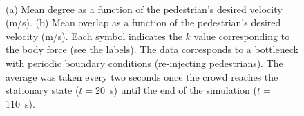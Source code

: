 \documentclass[preprint,12pt]{elsarticle}
\begin{document}
\begin{figure}[!htbp]
\centering
    \ 
    \\
\caption[width=0.47\columnwidth]{(a) Mean degree as a function of the pedestrian’s desired velocity (m/s). (b) Mean overlap as a function of the pedestrian’s desired velocity (m/s). Each symbol indicates the $k$ value corresponding to the body force (see the labels). The data corresponds to a bottleneck with periodic boundary conditions (re-injecting pedestrians). The average was taken every two seconds once the crowd reaches the stationary state ($t=$20~s) until the end of the simulation ($t=$110~s).}
\label{degree_overlap_vd}
\end{figure}
\end{document}
